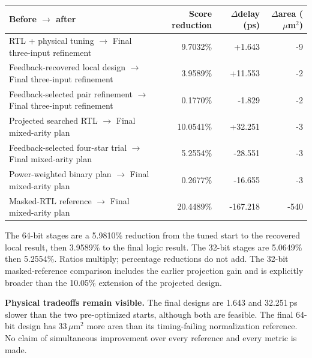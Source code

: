 \documentclass[10pt]{article}
\begin{document}
\begin{center}\small\setlength{\tabcolsep}{5pt}\begin{tabular}{@{}p{8.0cm}rrr@{}}\toprule
Before $\rightarrow$ after & Score reduction & $\Delta$delay (ps)&$\Delta$area ($\mu$m$^2$)\\\midrule
RTL + physical tuning $\rightarrow$ Final three-input refinement & 9.7032\% & +1.643 & -9\\
Feedback-recovered local design $\rightarrow$ Final three-input refinement & 3.9589\% & +11.553 & -2\\
Feedback-selected pair refinement $\rightarrow$ Final three-input refinement & 0.1770\% & -1.829 & -2\\
Projected searched RTL $\rightarrow$ Final mixed-arity plan & 10.0541\% & +32.251 & -3\\
Feedback-selected four-star trial $\rightarrow$ Final mixed-arity plan & 5.2554\% & -28.551 & -3\\
Power-weighted binary plan $\rightarrow$ Final mixed-arity plan & 0.2677\% & -16.655 & -3\\
Masked-RTL reference $\rightarrow$ Final mixed-arity plan & 20.4489\% & -167.218 & -540\\
\bottomrule\end{tabular}\end{center}
The 64-bit stages are a 5.9810\% reduction from the tuned start to the recovered local result, then 3.9589\% to the final logic result. The 32-bit stages are 5.0649\% then 5.2554\%. Ratios multiply; percentage reductions do not add. The 32-bit masked-reference comparison includes the earlier projection gain and is explicitly broader than the 10.05\% extension of the projected design.

\textbf{Physical tradeoffs remain visible.} The final designs are 1.643 and 32.251\,ps slower than the two pre-optimized starts, although both are feasible. The final 64-bit design has 33\,$\mu$m$^2$ more area than its timing-failing normalization reference. No claim of simultaneous improvement over every reference and every metric is made.
\end{document}
